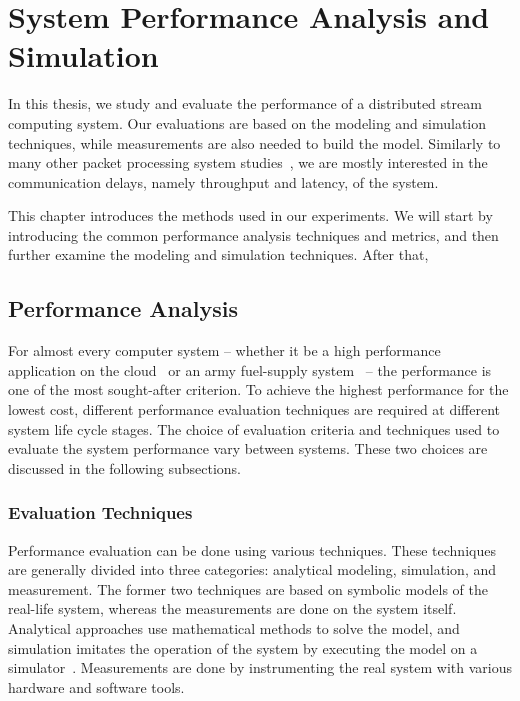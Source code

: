 \chapter{System Performance Analysis and Simulation}
\label{chapter:system-performance-analysis-and-simulation}

In this thesis, we study and evaluate the performance of a distributed stream computing system. Our evaluations are based on the modeling and simulation techniques, while measurements are also needed to build the model. Similarly to many other packet processing system studies~\cite{cavium:2010:fundamentals}, we are mostly interested in the communication delays, namely throughput and latency, of the system.

This chapter introduces the methods used in our experiments. We will start by introducing the common performance analysis techniques and metrics, and then further examine the modeling and simulation techniques. After that, 

\section{Performance Analysis}
For almost every computer system -- whether it be a high performance application on the cloud~\cite{jackson:2010:HPCOC} or an army fuel-supply system~\cite{sabuncuoglu:2005:TAS} -- the performance is one of the most sought-after criterion. To achieve the highest performance for the lowest cost, different performance evaluation techniques are required at different system life cycle stages. The choice of evaluation criteria and techniques used to evaluate the system performance vary between systems. These two choices are discussed in the following subsections.~\cite{jain:1991:AOCSPA}

\subsection{Evaluation Techniques}
Performance evaluation can be done using various techniques. These techniques are generally divided into three categories: analytical modeling, simulation, and measurement. The former two techniques are based on symbolic models of the real-life system, whereas the measurements are done on the system itself. Analytical approaches use mathematical methods to solve the model, and simulation imitates the operation of the system by executing the model on a simulator~\cite{Banks:2010:DES}. Measurements are done by instrumenting the real system with various hardware and software tools.~\cite{jain:1991:AOCSPA}

